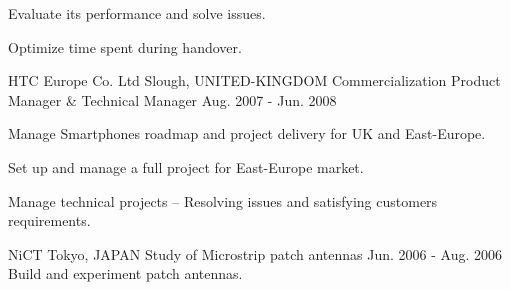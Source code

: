 \begin{cventries}
{\begin{cvitems}
        \item {Evaluate its performance and solve issues.}
        \item {Optimize time spent during handover.}
      \end{cvitems} 
    }
  \cventry
    {HTC Europe Co. Ltd}
    {Slough, UNITED-KINGDOM}
    {Commercialization Product Manager \& Technical Manager}
    {Aug. 2007 - Jun. 2008}
    {
      \begin{cvitems}
        \item {Manage Smartphones roadmap and project delivery for UK and East-Europe.}
        \item {Set up and manage a full project for East-Europe market.}
        \item {Manage technical projects -- Resolving issues and satisfying customers requirements.}
      \end{cvitems}
    }
  \cventry
    {NiCT}
    {Tokyo, JAPAN}
    {Study of Microstrip patch antennas}
    {Jun. 2006 - Aug. 2006}
    {\quad \quad Build and experiment patch antennas.}
  
\end{cventries}
